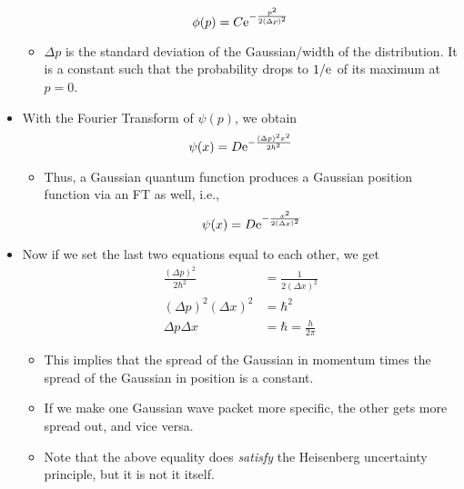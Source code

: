 \documentclass[../notes.tex]{subfiles}
\begin{document}
\begin{itemize}
\begin{equation*}
        \phi(p) = C\e[-\frac{p^2}{2(\Delta p)^2}]
    \end{equation*}
    \begin{itemize}
        \item $\Delta p$ is the standard deviation of the Gaussian/width of the distribution. It is a constant such that the probability drops to $1/\e$ of its maximum at $p=0$.
    \end{itemize}
    \item With the Fourier Transform of $\psi(p)$, we obtain
    \begin{equation*}
        \psi(x) = D\e[-\frac{(\Delta p)^2x^2}{2\hbar^2}]
    \end{equation*}
    \begin{itemize}
        \item Thus, a Gaussian quantum function produces a Gaussian position function via an FT as well, i.e.,
        \begin{equation*}
            \psi(x) = D\e[-\frac{x^2}{2(\Delta x)^2}]
        \end{equation*}
    \end{itemize}
    \item Now if we set the last two equations equal to each other, we get
    \begin{align*}
        \frac{(\Delta p)^2}{2\hbar^2} &= \frac{1}{2(\Delta x)^2}\\
        (\Delta p)^2(\Delta x)^2 &= \hbar^2\\
        \Delta p\Delta x &= \hbar = \frac{h}{2\pi}
    \end{align*}
    \begin{itemize}
        \item This implies that the spread of the Gaussian in momentum times the spread of the Gaussian in position is a constant.
        \item If we make one Gaussian wave packet more specific, the other gets more spread out, and vice versa.
        \item Note that the above equality does \emph{satisfy} the Heisenberg uncertainty principle, but it is not it itself.
    \end{itemize}
\end{itemize}
\end{document}
